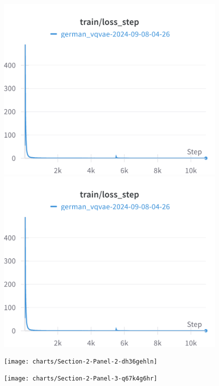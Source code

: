 
\begin{figure}[!htb]
\includegraphics[width=\linewidth]{detailed_engineering/German VQVAE/charts/train_loss_step.png}
\caption{}
\endminipage\hfill
{}
\includegraphics[width=\linewidth]{detailed_engineering/German VQVAE/charts/train_loss_step.png}
\caption{}
\endminipage
\end{figure}

\begin{figure}[!htb]
\texttt{[image: charts/Section-2-Panel-2-dh36gehln]}
\caption{}
\endminipage\hfill
{}
\texttt{[image: charts/Section-2-Panel-3-q67k4g6hr]}
\caption{}
\endminipage
\end{figure}


